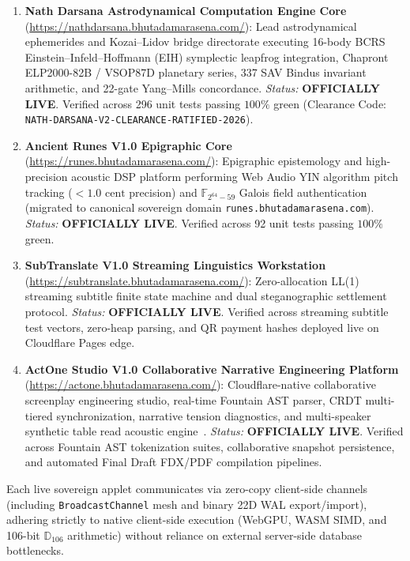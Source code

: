 \documentclass[11pt,a4paper,reqno]{article}
\theoremstyle{plain}
\theoremstyle{definition}
\theoremstyle{remark}
\numberwithin{equation}{section}
\begin{document}
\begin{enumerate}[label=\textbf{(\arabic*)}, leftmargin=2.2em]
  \item \textbf{Nath Darsana Astrodynamical Computation Engine Core} (\url{https://nathdarsana.bhutadamarasena.com/}): 
  Lead astrodynamical ephemerides and Kozai--Lidov bridge directorate executing 16-body BCRS Einstein--Infeld--Hoffmann (EIH) symplectic leapfrog integration, Chapront ELP2000-82B / VSOP87D planetary series, 337 SAV Bindus invariant arithmetic, and 22-gate Yang--Mills concordance. 
  \emph{Status:} \textbf{OFFICIALLY LIVE}. Verified across 296 unit tests passing $100\%$ green (Clearance Code: \texttt{NATH-DARSANA-V2-CLEARANCE-RATIFIED-2026}).
  
  \item \textbf{Ancient Runes V1.0 Epigraphic Core} (\url{https://runes.bhutadamarasena.com/}): 
  Epigraphic epistemology and high-precision acoustic DSP platform performing Web Audio YIN algorithm pitch tracking ($< 1.0\text{ cent}$ precision) and $\mathbb{F}_{2^{64}-59}$ Galois field authentication (migrated to canonical sovereign domain \texttt{runes.bhutadamarasena.com}). 
  \emph{Status:} \textbf{OFFICIALLY LIVE}. Verified across 92 unit tests passing $100\%$ green.
  
  \item \textbf{SubTranslate V1.0 Streaming Linguistics Workstation} (\url{https://subtranslate.bhutadamarasena.com/}): 
  Zero-allocation LL(1) streaming subtitle finite state machine and dual steganographic settlement protocol. 
  \emph{Status:} \textbf{OFFICIALLY LIVE}. Verified across streaming subtitle test vectors, zero-heap parsing, and QR payment hashes deployed live on Cloudflare Pages edge.

  \item \textbf{ActOne Studio V1.0 Collaborative Narrative Engineering Platform} (\url{https://actone.bhutadamarasena.com/}): 
  Cloudflare-native collaborative screenplay engineering studio, real-time Fountain AST parser, CRDT multi-tiered synchronization, narrative tension diagnostics, and multi-speaker synthetic table read acoustic engine~\cite{ActOneStudioMonograph2026}. 
  \emph{Status:} \textbf{OFFICIALLY LIVE}. Verified across Fountain AST tokenization suites, collaborative snapshot persistence, and automated Final Draft FDX/PDF compilation pipelines.
\end{enumerate}

Each live sovereign applet communicates via zero-copy client-side channels (including \texttt{BroadcastChannel} mesh and binary 22D WAL export/import), adhering strictly to native client-side execution (WebGPU, WASM SIMD, and 106-bit $\mathbb{D}_{106}$ arithmetic) without reliance on external server-side database bottlenecks.
\end{document}
